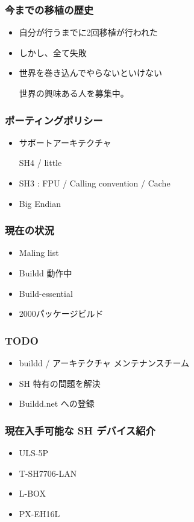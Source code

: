 \documentclass[cjk,dvipdfmx,12pt]{beamer}
\begin{document}
\begin{frame} 
\frametitle{今までの移植の歴史}
  \begin{itemize}
    \item 自分が行うまでに2回移植が行われた
    \item しかし、全て失敗
    \item 世界を巻き込んでやらないといけない

	世界の興味ある人を募集中。 
  \end{itemize}
\end{frame}


\begin{frame} 
\frametitle{ポーティングポリシー}
  \begin{itemize}
    \item サポートアーキテクチャ

	SH4 / little

    \item SH3 : FPU / Calling convention / Cache   
    \item Big Endian
	
  \end{itemize}
\end{frame}


\begin{frame} 
\frametitle{現在の状況}
  \begin{itemize}
    \item Maling list
    \item Buildd 動作中   
    \item Build-essential
    \item 2000パッケージビルド
  \end{itemize}
\end{frame}

\begin{frame} 
\frametitle{TODO}
  \begin{itemize}
    \item buildd / アーキテクチャ メンテナンスチーム
    \item SH 特有の問題を解決   
    \item Buildd.net への登録
  \end{itemize}
\end{frame}


\begin{frame} 
\frametitle{現在入手可能な SH デバイス紹介}
  \begin{itemize}
    \item ULS-5P
    \item T-SH7706-LAN   
    \item L-BOX
    \item PX-EH16L
  \end{itemize}
\end{frame}
\end{document}
